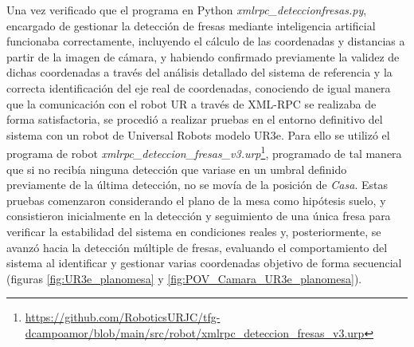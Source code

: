 Una vez verificado que el programa en Python \textit{xmlrpc\_deteccionfresas.py}, encargado de gestionar la detección de fresas mediante inteligencia artificial funcionaba correctamente, incluyendo el cálculo de las coordenadas y distancias a partir de la imagen de cámara, y habiendo confirmado previamente la validez de dichas coordenadas a través del análisis detallado del sistema de referencia y la correcta identificación del eje real de coordenadas, conociendo de igual manera que la comunicación con el robot UR a través de XML-RPC se realizaba de forma satisfactoria, se procedió a realizar pruebas en el entorno definitivo del sistema con un robot de Universal Robots modelo UR3e. Para ello se utilizó el programa de robot \textit{xmlrpc\_deteccion\_fresas\_v3.urp}\footnote{\url{https://github.com/RoboticsURJC/tfg-dcampoamor/blob/main/src/robot/xmlrpc_deteccion_fresas_v3.urp}}, programado de tal manera que si no recibía ninguna detección que variase en un umbral definido previamente de la última detección, no se movía de la posición de \textit{Casa}. Estas pruebas comenzaron considerando el plano de la mesa como hipótesis suelo, y consistieron inicialmente en la detección y seguimiento de una única fresa para verificar la estabilidad del sistema en condiciones reales y, posteriormente, se avanzó hacia la detección múltiple de fresas, evaluando el comportamiento del sistema al identificar y gestionar varias coordenadas objetivo de forma secuencial (figuras \ref{fig:UR3e_planomesa} y \ref{fig:POV_Camara_UR3e_planomesa}).

